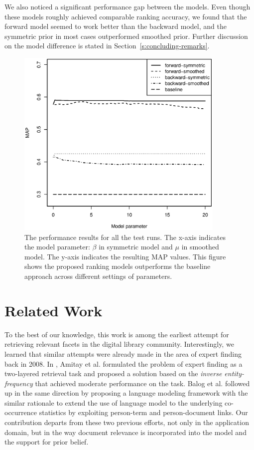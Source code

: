We also noticed a significant performance gap between the models.  Even though
these models roughly achieved comparable ranking accuracy, we found that the
forward model seemed to work better than the backward model, and the symmetric
prior in most cases outperformed smoothed prior.  Further discussion on the
model difference is stated in Section~\ref{s:concluding-remarks}.

\begin{figure}[ht!]
  \centering
  \includegraphics[width=10cm]{performance.eps}
  \caption{The performance results for all the test runs.  The x-axis indicates
  the model parameter: $\beta$ in symmetric model and $\mu$ in smoothed model.
  The y-axis indicates the resulting MAP values.  This figure shows the
  proposed ranking models outperforms the baseline approach across different
  settings of parameters.} \label{f:performance}
\end{figure}

\section{Related Work}\label{s:related-work}

To the best of our knowledge, this work is among the earliest attempt for
retrieving relevant facets in the digital library community.  Interestingly, we
learned that similar attempts were already made in the area of expert finding
back in 2008.  In \cite{amitay2008finding}, Amitay et al. formulated the
problem of expert finding as a two-layered retrieval task and proposed a
solution based on the \emph{inverse entity-frequency} that achieved moderate
performance on the task.  Balog et al. \cite{balog2009language} followed up in
the same direction by proposing a language modeling framework with the similar
rationale to extend the use of language model to the underlying co-occurrence
statistics by exploiting person-term and person-document links.  Our
contribution departs from these two previous efforts, not only in the
application domain, but in the way document relevance is incorporated into the
model and the support for prior belief.  
 

